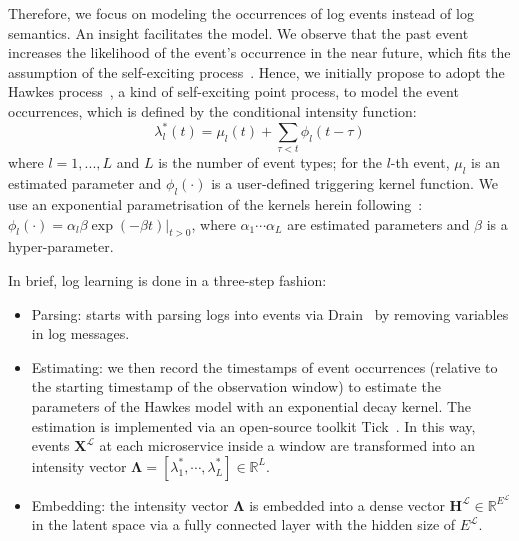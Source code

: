 Therefore, we focus on modeling the occurrences of log events instead of log semantics. 
An insight facilitates the model. We observe that the past event increases the likelihood of the event's occurrence in the near future, which fits the assumption of the self-exciting process~\cite{self-exciting}. 
Hence, we initially propose to adopt the Hawkes process~\cite{Hawkes}, a kind of self-exciting point process, to model the event occurrences, which is defined by the conditional intensity function:
\begin{equation}\label{eq:hawkes}
    \lambda_l^*(t) = \mu_l(t)+\sum_{\tau < t} \phi_l(t-\tau)
\end{equation}
where $l=1,...,L$ and $L$ is the number of event types; for the $l$-th event, $\mu_l$ is an estimated parameter and $\phi_l (\cdot)$ is a user-defined triggering kernel function. 
We use an exponential parametrisation of the kernels herein following~\cite{HawkesADM4}: $\phi_l (\cdot) = \alpha_l\beta \exp(-\beta t)|_{t>0}$, where $\alpha_1 \cdots \alpha_L$ are estimated parameters and $\beta$ is a hyper-parameter.

In brief, log learning is done in a three-step fashion:
\begin{itemize}[leftmargin=12pt, topsep=3pt]
\setlength\itemsep{0.4em}
\item[A.] Parsing: \name starts with parsing logs into events via Drain~\cite{Drain} by removing variables in log messages.

\item[B.] Estimating: we then record the timestamps of event occurrences (relative to the starting timestamp of the observation window) to estimate the parameters of the Hawkes model with an exponential decay kernel. The estimation is implemented via an open-source toolkit Tick~\cite{tick}.
In this way, events $\mathbf{X}^\mathcal{L}$ at each microservice inside a window are transformed into an intensity vector $\boldsymbol{\Lambda}=[\lambda_1^*,\cdots,\lambda_L^*] \in \mathbb{R}^L$. 

\item[C.] Embedding: the intensity vector $\boldsymbol{\Lambda}$ is embedded into a dense vector $\boldsymbol{H}^\mathcal{L} \in \mathbb{R}^{E^\mathcal{L}}$ in the latent space via a fully connected layer with the hidden size of ${E^\mathcal{L}}$.
\end{itemize}

